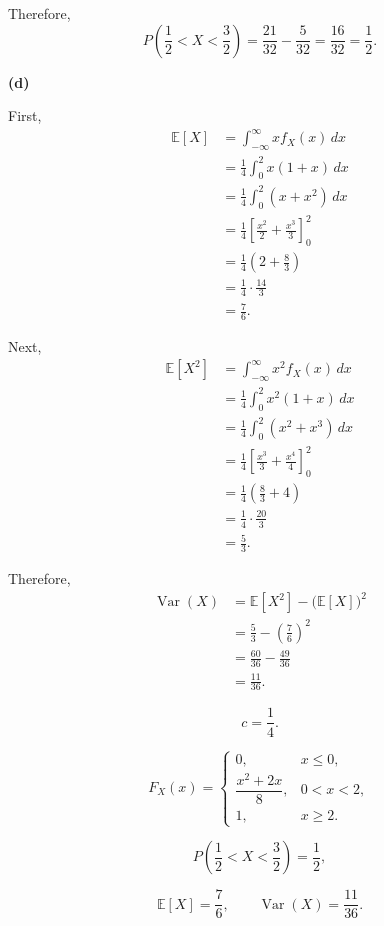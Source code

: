 \documentclass[11pt]{article}
\begin{document}
\begin{solutionbox}
Therefore,
\[
P\left(\frac12<X<\frac32\right)
=
\frac{21}{32}-\frac{5}{32}
=
\frac{16}{32}
=
\frac12.
\]


\textbf{(d)}

First,
\begin{align*}
\mathbb{E}[X]
&=
\int_{-\infty}^{\infty}x f_X(x)\,dx\\
&=
\frac14\int_0^2x(1+x)\,dx\\
&=
\frac14\int_0^2(x+x^2)\,dx\\
&=
\frac14
\left[
\frac{x^2}{2}+\frac{x^3}{3}
\right]_0^2\\
&=
\frac14
\left(
2+\frac83
\right)\\
&=
\frac14\cdot\frac{14}{3}\\
&=
\frac76.
\end{align*}

Next,
\begin{align*}
\mathbb{E}[X^2]
&=
\int_{-\infty}^{\infty}x^2f_X(x)\,dx\\
&=
\frac14\int_0^2x^2(1+x)\,dx\\
&=
\frac14\int_0^2(x^2+x^3)\,dx\\
&=
\frac14
\left[
\frac{x^3}{3}+\frac{x^4}{4}
\right]_0^2\\
&=
\frac14
\left(
\frac83+4
\right)\\
&=
\frac14\cdot\frac{20}{3}\\
&=
\frac53.
\end{align*}

Therefore,
\begin{align*}
\operatorname{Var}(X)
&=
\mathbb{E}[X^2]
-
\bigl(\mathbb{E}[X]\bigr)^2\\
&=
\frac53
-
\left(\frac76\right)^2\\
&=
\frac{60}{36}
-
\frac{49}{36}\\
&=
\frac{11}{36}.
\end{align*}


\begin{finalanswerbox}

\[
c=\frac14.
\]

\[
F_X(x)
=
\begin{cases}
0, & x\leq0,\\[1mm]
\dfrac{x^2+2x}{8}, & 0<x<2,\\[2mm]
1, & x\geq2.
\end{cases}
\]

\[
P\left(\frac12<X<\frac32\right)=\frac12,
\]

\[
\mathbb{E}[X]=\frac76,
\qquad
\operatorname{Var}(X)=\frac{11}{36}.
\]

\end{finalanswerbox}

\end{solutionbox}
\end{document}
